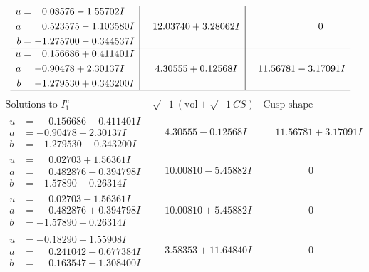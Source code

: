 \documentclass[1p]{elsarticle_modified}
\theoremstyle{definition}
\newcommand{\I}{\sqrt{-1}}
\begin{document}
$$\begin{array}{c|c|c}
\begin{aligned}
u &= \phantom{-}0.08576 - 1.55702 I \\
a &= \phantom{-}0.523575 - 1.103580 I \\
b &= -1.275700 - 0.344537 I\end{aligned}
 & \phantom{-}12.03740 + 3.28062 I & \phantom{-0.000000 } 0 \\ \hline\begin{aligned}
u &= \phantom{-}0.156686 + 0.411401 I \\
a &= -0.90478 + 2.30137 I \\
b &= -1.279530 + 0.343200 I\end{aligned}
 & \phantom{-}4.30555 + 0.12568 I & \phantom{-}11.56781 - 3.17091 I\\
 \hline 
 \end{array}$$\newpage$$\begin{array}{c|c|c}  
\text{Solutions to }I^u_{1}& \I (\text{vol} + \sqrt{-1}CS) & \text{Cusp shape}\\
 \hline 
\begin{aligned}
u &= \phantom{-}0.156686 - 0.411401 I \\
a &= -0.90478 - 2.30137 I \\
b &= -1.279530 - 0.343200 I\end{aligned}
 & \phantom{-}4.30555 - 0.12568 I & \phantom{-}11.56781 + 3.17091 I \\ \hline\begin{aligned}
u &= \phantom{-}0.02703 + 1.56361 I \\
a &= \phantom{-}0.482876 - 0.394798 I \\
b &= -1.57890 - 0.26314 I\end{aligned}
 & \phantom{-}10.00810 - 5.45882 I & \phantom{-0.000000 } 0 \\ \hline\begin{aligned}
u &= \phantom{-}0.02703 - 1.56361 I \\
a &= \phantom{-}0.482876 + 0.394798 I \\
b &= -1.57890 + 0.26314 I\end{aligned}
 & \phantom{-}10.00810 + 5.45882 I & \phantom{-0.000000 } 0 \\ \hline\begin{aligned}
u &= -0.18290 + 1.55908 I \\
a &= \phantom{-}0.241042 - 0.677384 I \\
b &= \phantom{-}0.163547 - 1.308400 I\end{aligned}
 & \phantom{-}3.58353 + 11.64840 I & \phantom{-0.000000 } 0 \\ \hline\begin{aligned}

\end{aligned}
\end{array}$$
\end{document}

